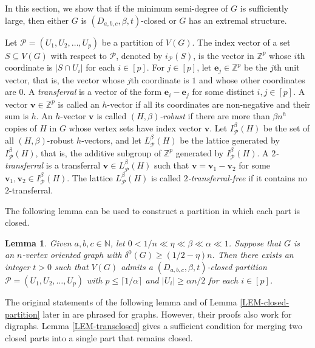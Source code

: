 \documentclass[11pt,a4paper,reqno]{amsart}
\newtheorem{lemma}[theorem]{Lemma}
\theoremstyle{definition} %
\begin{document}
In this section, we show that if the minimum semi-degree of $G$ is sufficiently large, then either $G$ is $(D_{a,b,c},\beta,t)$-closed or $G$ has an extremal structure.



Let $\mathcal{P}=(U_1,U_2,\ldots,U_p)$ be a partition of $V(G)$. The index vector of a set $S\subseteq V(G)$ with respect to $\mathcal{P}$, denoted by $i_{\mathcal{P}}(S)$, is the vector in $\mathbb{Z}^p$ whose $i$th coordinate is $|S\cap U_i|$ for each $i\in [p]$. For $j\in [p]$, let $\mathbf{e}_j\in \mathbb{Z}^p$ be the $j$th unit vector, that is, the vector whose $j$th coordinate is $1$ and whose other coordinates are $0$. A \emph{transferral} is a vector of the form $\mathbf{e}_i-\mathbf{e}_j$ for some distinct $i,j\in [p]$. A vector $\mathbf{v}\in \mathbb{Z}^p$ is called an $h$-vector if all its coordinates are non-negative and their sum is $h$. An $h$-vector $\mathbf{v}$ is called \emph{$(H,\beta)$-robust} if there are more than $\beta n^h$ copies of $H$ in $G$ whose vertex sets have index vector $\mathbf{v}$. Let $I^\beta_{\mathcal{P}}(H)$ be the set of all $(H,\beta)$-robust $h$-vectors, and let $L^\beta_{\mathcal{P}}(H)$ be the lattice generated by $I^\beta_{\mathcal{P}}(H)$, that is, the additive subgroup of $\mathbb{Z}^p$ generated by $I^\beta_{\mathcal{P}}(H)$. A \emph{$2$-transferral} is a transferral $\mathbf{v}\in L^\beta_{\mathcal{P}}(H)$ such that $\mathbf{v}=\mathbf{v}_1-\mathbf{v}_2$ for some $\mathbf{v}_1,\mathbf{v}_2\in I^\beta_{\mathcal{P}}(H)$. The lattice $L^\beta_{\mathcal{P}}(H)$ is called \emph{$2$-transferral-free} if it contains no $2$-transferral.

The following lemma can be used to construct a partition in which each part is closed.

\begin{lemma} \label{LEM-degreeclosepart}
    Given $a,b,c \in \mathbb{N}$, let $0<1/n\ll\eta\ll  \beta \ll \alpha \ll 1$. Suppose that $G$ is an $n$-vertex oriented graph with $\delta^0(G)\geqslant (1/2-\eta)n$. Then there exists an integer $t>0$ such that $V(G)$ admits a $(D_{a,b,c},\beta,t)$-closed partition $\mathcal{P}=(U_1,U_2,\ldots,U_p)$ with $p \leqslant \lceil 1/\alpha \rceil$ and $|U_i|\geqslant \alpha n/2$ for each $i\in [p]$.
\end{lemma}

The original statements of the following lemma and of Lemma \ref{LEM-closed-partition} later in \cite{hanRSA64} are phrased for graphs. However, their proofs also work for digraphs.  Lemma \ref{LEM-transclosed} gives a sufficient condition for merging two closed parts into a single part that remains closed.
\end{document}
